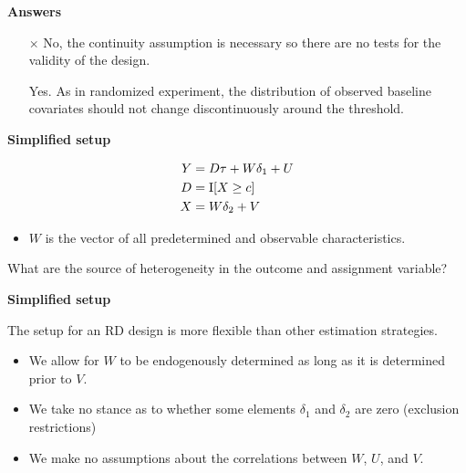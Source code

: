 \begin{frame}\textbf{Answers}\vspace{0.3cm}

\begin{itemize}\setlength\itemsep{1em}
\item[$\times$] No, the continuity assumption is necessary so there are no tests for the validity of the design.

\item[\checkmark] Yes. As in randomized experiment, the distribution of observed baseline covariates should not change discontinuously around the threshold.

\end{itemize}

\end{frame}
\begin{frame}\textbf{Simplified setup}\vspace{0.3cm}

\begin{align*}
Y & = D \tau + W \delta_1 + U \\
D & = \mathrm{I}[X \geq c] \\
X & = W \delta_2 + V
\end{align*}

\begin{itemize}
\item $W$ is the vector of all predetermined and observable characteristics.
\end{itemize}

What are the source of heterogeneity in the outcome and assignment variable?

\end{frame}
\begin{frame}\textbf{Simplified setup}\vspace{0.3cm}

The setup for an RD design is more flexible than other estimation strategies.\vspace{0.3cm}

\begin{itemize}\setlength\itemsep{1em}
\item We allow for $W$ to be endogenously determined as long as it is determined prior to $V$.

\item We take no stance as to whether some elements $\delta_1$ and $\delta_2$ are zero (exclusion restrictions)

\item We make no assumptions about the correlations between $W$, $U$, and $V$.

\end{itemize}
\end{frame}
